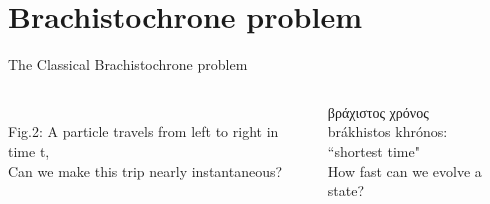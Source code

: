 \documentclass[10pt]{beamer}
\begin{document}
\section{Brachistochrone problem}
\begin{frame}{The Classical Brachistochrone problem}
\vspace{0.5cm}
\begin{columns}
    \hspace{1.5em}
    \begin{column}{\textwidth}
    \\
    \hspace{1em}
    \tiny{Fig.2:
    A particle travels from left to right in time t,\\
    \hspace{2.4em}
    Can we make this trip nearly instantaneous?}
    \end{column}
    
    \hspace{-15em}
    \begin{column}{0.5\textwidth}
        βράχιστος χρόνος\\
        brákhistos khrónos:\\
        ``shortest time"\\
    \vspace{1cm}
    \pause
    \small{\textcolor{myNewColorC}{How fast can we evolve a state?}
    }
    \end{column}
    \end{columns}
\end{frame}
\end{document}
